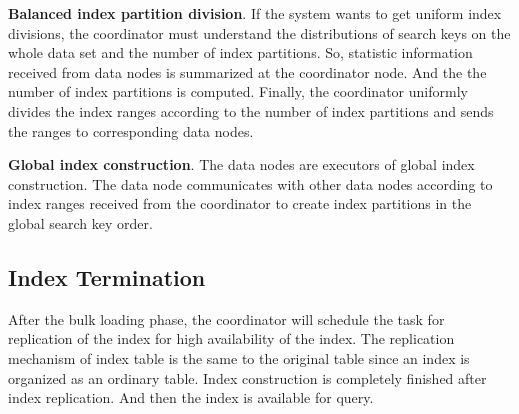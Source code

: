 \textbf{Balanced index partition division}.
If the system wants to get uniform index divisions, the coordinator must understand the distributions of search keys on the whole data set and the number of index partitions. So, statistic information received from data nodes is summarized at the coordinator node. And the the number of index partitions is computed. Finally, the coordinator uniformly divides the index ranges according to the number of index partitions and sends the ranges to corresponding data nodes.

\textbf{Global index construction}.
 The data nodes are executors of global index construction. The data node communicates with other data nodes according to index ranges received from the coordinator to create index partitions in the global search key order.
\vspace{-0.2cm}
\subsection{Index Termination}
 After the bulk loading phase, the coordinator will schedule the task for replication of the index for high availability of the index. %
The replication mechanism of index table is the same to the original table since an index is organized as an ordinary table. Index construction is completely finished after index replication. And then the index is available for query.
